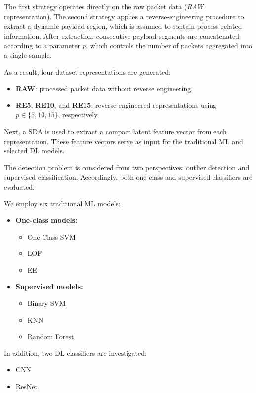 The first strategy operates directly on the raw packet data
(\textit{RAW} representation). The second strategy applies a
reverse-engineering procedure to extract a dynamic payload region,
which is assumed to contain process-related information.
After extraction, consecutive payload segments are concatenated
according to a parameter $p$, which controls the number of packets
aggregated into a single sample.

As a result, four dataset representations are generated:
\begin{itemize}
    \item \textbf{RAW}: processed packet data without reverse engineering,
    \item \textbf{RE5}, \textbf{RE10}, and \textbf{RE15}: reverse-engineered
    representations using $p \in \{5,10,15\}$, respectively.
\end{itemize}

Next, a \ac{SDA} is used to extract a compact latent feature vector
from each representation. These feature vectors serve as input for
the traditional \ac{ML} and selected \ac{DL} models.

The detection problem is considered from two perspectives:
outlier detection and supervised classification.
Accordingly, both one-class and supervised classifiers are evaluated.

We employ six traditional \ac{ML} models:

\begin{itemize}
    \item \textbf{One-class models:}
    \begin{itemize}
        \item One-Class \ac{SVM}
        \item \ac{LOF}
        \item \ac{EE}
    \end{itemize}
    
    \item \textbf{Supervised models:}
    \begin{itemize}
        \item Binary \ac{SVM}
        \item \ac{KNN}
        \item Random Forest
    \end{itemize}
\end{itemize}

In addition, two \ac{DL} classifiers are investigated:

\begin{itemize}
    \item \ac{CNN}
    \item \ac{ResNet}
\end{itemize}

